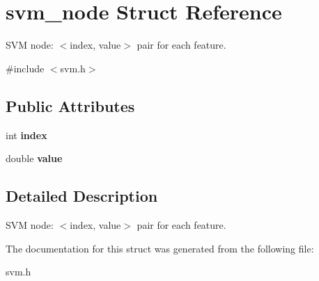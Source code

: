\hypertarget{structsvm__node}{\section{svm\+\_\+node Struct Reference}
\label{structsvm__node}
}


S\+V\+M node\+: $<$index, value$>$ pair for each feature.  




{\ttfamily \#include $<$svm.\+h$>$}

\subsection*{Public Attributes}
\begin{DoxyCompactItemize}
\item 
\hypertarget{structsvm__node_aa733ca75ee5a5c0f36af5ddb4c6394d9}{int {\bfseries index}}\label{structsvm__node_aa733ca75ee5a5c0f36af5ddb4c6394d9}

\item 
\hypertarget{structsvm__node_a9ca47b8a156238d04213453f3b89e177}{double {\bfseries value}}\label{structsvm__node_a9ca47b8a156238d04213453f3b89e177}

\end{DoxyCompactItemize}


\subsection{Detailed Description}
S\+V\+M node\+: $<$index, value$>$ pair for each feature. 

The documentation for this struct was generated from the following file\+:\begin{DoxyCompactItemize}
\item 
svm.\+h\end{DoxyCompactItemize}
